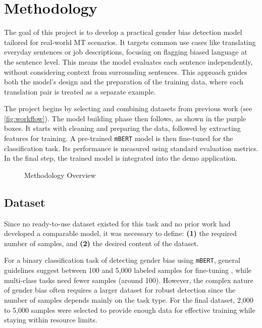 \chapter{Methodology}
The goal of this project is to develop a practical gender bias detection model tailored for real-world MT scenarios. It targets common use cases like translating everyday sentences or job descriptions, focusing on flagging biased language at the sentence level. This means the model evaluates each sentence independently, without considering context from surrounding sentences. This approach guides both the model’s design and the preparation of the training data, where each translation pair is treated as a separate example. 

The project begins by selecting and combining datasets from previous work (see \autoref{fig:workflow}). The model building phase then follows, as shown in the purple boxes. It starts with cleaning and preparing the data, followed by extracting features for training. A pre-trained \texttt{mBERT} model is then fine-tuned for the classification task. Its performance is measured using standard evaluation metrics. In the final step, the trained model is integrated  into the demo application.

\vspace{1cm} 
\begin{figure}[htb]
    \centering
    \scalebox{0.8}{}
    \caption{Methodology Overview}
    \label{fig:workflow}
\end{figure}
\vspace{1cm} 

\section{Dataset}
    Since no ready-to-use dataset existed for this task and no prior work had developed a comparable model, it was necessary to define: \textbf{(1)} the required number of samples, and \textbf{(2)} the desired content of the dataset.

    For a binary classification task of detecting gender bias using \texttt{mBERT}, general guidelines suggest between 100 and 5,000 labeled samples for fine-tuning \parencite{pecherComparingSpecialisedSmall2024}, while multi-class tasks need fewer samples (around 100). However, the complex nature of gender bias often requires a larger dataset for robust detection since the number of samples depends mainly on the task type. For the final dataset, 2,000 to 5,000 samples were selected to provide enough data for effective training while staying within resource limits.

